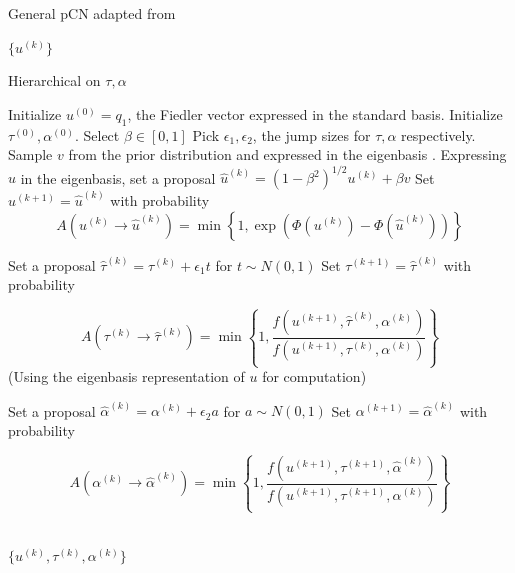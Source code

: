\documentclass{siamart1116}
\begin{document}
\begin{algorithm}
\caption{General pCN adapted from \cite{CoRoStWh13}}
\label{alg:generalpCN}
\begin{algorithmic}
\EndFor
\State \Return $\{u^{(k)}\}$
\end{algorithmic}
\end{algorithm}

\begin{algorithm}
\caption{Hierarchical on $\tau, \alpha$}
\label{alg:hierarchical_tau_alpha}
\begin{algorithmic}
\State Initialize $u^{(0)} = q_1$, the Fiedler vector expressed in the standard basis.
\State Initialize $\tau^{(0)}, \alpha^{(0)}$. Select $\beta \in [0, 1]$
\State Pick $\epsilon_1, \epsilon_2$, the jump sizes for $\tau, \alpha$ respectively.
\State Sample $v$ from the prior distribution and expressed in the eigenbasis .
\State Expressing $u$ in the eigenbasis, set a proposal $\hat u^{(k)} = (1- \beta^2)^{1/2}u^{(k)} + \beta v$
\State Set $u^{(k+1)} = \hat u^{(k)}$ with probability 
\[A(u^{(k)} \to \hat u^{(k)}) = \min \left\{1, \exp(\Phi(u^{(k)}) - \Phi(\hat u^{(k)})) \right\}\]

\State Set a proposal $\hat \tau^{(k)} = \tau^{(k)} + \epsilon_1 t$ for $t \sim N(0, 1)$ 
\State Set $\tau^{(k+1)} = \hat \tau^{(k)}$ with probability 

\[A(\tau^{(k)} \to \hat \tau^{(k)}) = \min \left\{ 1, \frac{f(u^{(k+1)}, \hat \tau^{(k)}, \alpha^{(k)})}{f(u^{(k+1)}, \tau^{(k)}, \alpha^{(k)})}\right\}\]
(Using the eigenbasis representation of $u$ for computation) 

\State Set a proposal $\hat \alpha^{(k)} = \alpha^{(k)} + \epsilon_2 a$ for $a \sim N(0, 1)$ 
\State Set $\alpha^{(k+1)} = \hat \alpha^{(k)}$ with probability

 \[A(\alpha^{(k)}\to\hat\alpha^{(k)}) = 
 \min\left\{1, 
 \frac{f(u^{(k+1)}, \tau^{(k+1)}, \hat \alpha^{(k)})}
 {f(u^{(k+1)}, \tau^{(k+1)}, \alpha^{(k)})}\right\}
 \]


\EndFor\\
\Return $\{u^{(k)}, \tau^{(k)}, \alpha^{(k)}\}$
\end{algorithmic}
\end{algorithm}
\end{document}

